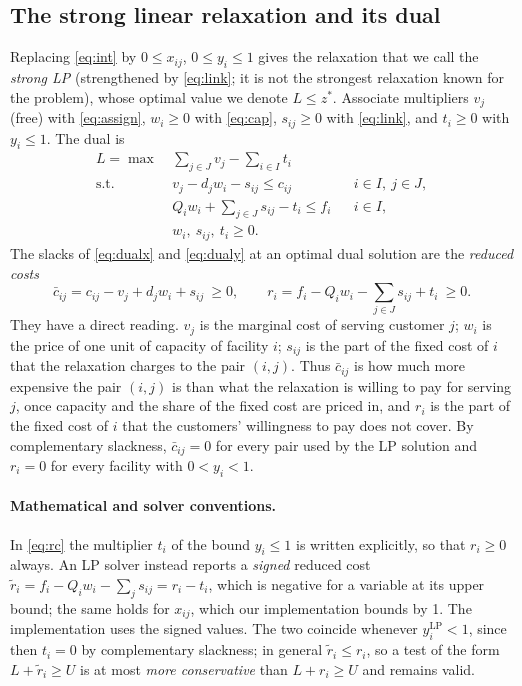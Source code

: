 \subsection{The strong linear relaxation and its dual}\label{sec:lp}
Replacing \eqref{eq:int} by $0\le x_{ij}$, $0\le y_i\le 1$ gives the relaxation that we call the
\emph{strong LP} (strengthened by \eqref{eq:link}; it is not the strongest relaxation known for
the problem), whose optimal value we denote $L\le z^\ast$. Associate multipliers $v_j$ (free) with \eqref{eq:assign},
$w_i\ge 0$ with \eqref{eq:cap}, $s_{ij}\ge 0$ with \eqref{eq:link}, and $t_i\ge 0$ with
$y_i\le 1$. The dual is
\begin{align}
L=\max\ & \sum_{j\in J} v_j-\sum_{i\in I} t_i \label{eq:dual}\\
\text{s.t.}\ & v_j - d_j w_i - s_{ij} \le c_{ij} && i\in I,\ j\in J, \label{eq:dualx}\\
& Q_i w_i + \sum_{j\in J} s_{ij} - t_i \le f_i && i\in I, \label{eq:dualy}\\
& w_i,\ s_{ij},\ t_i \ge 0. \nonumber
\end{align}
The slacks of \eqref{eq:dualx} and \eqref{eq:dualy} at an optimal dual solution are the
\emph{reduced costs}
\begin{equation}\label{eq:rc}
\bar c_{ij} = c_{ij} - v_j + d_j w_i + s_{ij}\ \ge 0,
\qquad
r_i = f_i - Q_i w_i - \sum_{j\in J} s_{ij} + t_i\ \ge 0 .
\end{equation}
They have a direct reading. $v_j$ is the marginal cost of serving customer $j$; $w_i$ is the price
of one unit of capacity of facility $i$; $s_{ij}$ is the part of the fixed cost of $i$ that the
relaxation charges to the pair $(i,j)$. Thus $\bar c_{ij}$ is how much more expensive the pair
$(i,j)$ is than what the relaxation is willing to pay for serving $j$, once capacity and the
share of the fixed cost are priced in, and $r_i$ is the part of the fixed cost of $i$ that the
customers' willingness to pay does not cover. By complementary slackness, $\bar c_{ij}=0$ for
every pair used by the LP solution and $r_i=0$ for every facility with $0<y_i<1$.
\paragraph{Mathematical and solver conventions.} In \eqref{eq:rc} the multiplier $t_i$ of the
bound $y_i\le1$ is written explicitly, so that $r_i\ge0$ always. An LP solver instead reports a
\emph{signed} reduced cost $\tilde r_i=f_i-Q_iw_i-\sum_j s_{ij}=r_i-t_i$, which is negative for
a variable at its upper bound; the same holds for $x_{ij}$, which our implementation bounds by 1.
The implementation uses the signed values. The two coincide whenever $y_i^{\mathrm{LP}}<1$, since then $t_i=0$ by complementary
slackness; in general $\tilde r_i\le r_i$, so a test of the form $L+\tilde r_i\ge U$ is at most
\emph{more conservative} than $L+r_i\ge U$ and remains valid.


